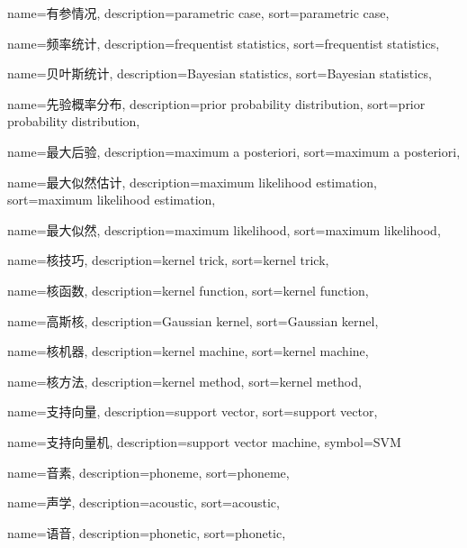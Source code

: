 {
  name=有参情况,
  description={parametric case},
  sort={parametric case},
}

{
  name=频率统计,
  description={frequentist statistics},
  sort={frequentist statistics},
}

{
  name=贝叶斯统计,
  description={Bayesian statistics},
  sort={Bayesian statistics},
}

{
  name=先验概率分布,
  description={prior probability distribution},
  sort={prior probability distribution},
}

{
  name=最大后验,
  description={maximum a posteriori},
  sort={maximum a posteriori},
}

{
  name=最大似然估计,
  description={maximum likelihood estimation},
  sort={maximum likelihood estimation},
}

{
  name=最大似然,
  description={maximum likelihood},
  sort={maximum likelihood},
}

{
  name=核技巧,
  description={kernel trick},
  sort={kernel trick},
}

{
  name=核函数,
  description={kernel function},
  sort={kernel function},
}

{
  name=高斯核,
  description={Gaussian kernel},
  sort={Gaussian kernel},
}

{
  name=核机器,
  description={kernel machine},
  sort={kernel machine},
}

{
  name=核方法,
  description={kernel method},
  sort={kernel method},
}

{
  name=支持向量,
  description={support vector},
  sort={support vector},
}

{
  name=支持向量机,
  description={support vector machine},
  symbol={SVM}
}

{
  name=音素,
  description={phoneme},
  sort={phoneme},
}

{
  name=声学,
  description={acoustic},
  sort={acoustic},
}

{
  name=语音,
  description={phonetic},
  sort={phonetic},
}

